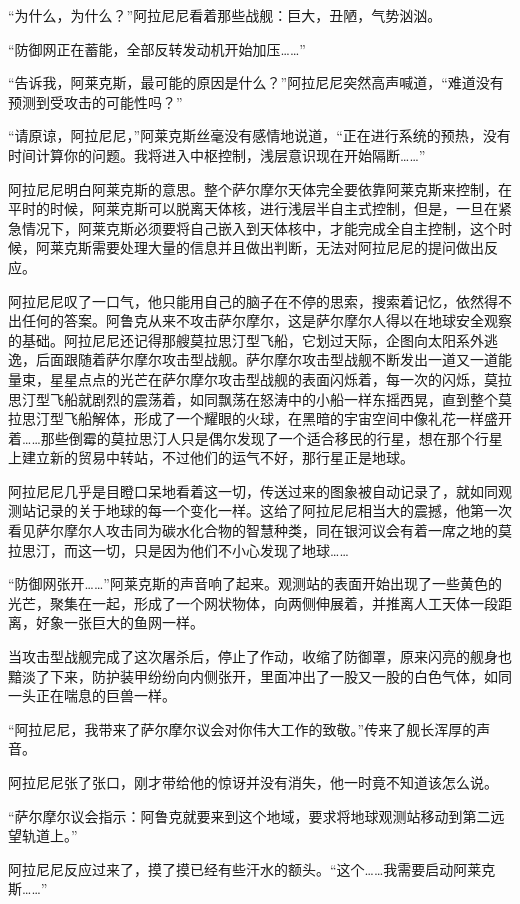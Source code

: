 “为什么，为什么？”阿拉尼尼看着那些战舰：巨大，丑陋，气势汹汹。

“防御网正在蓄能，全部反转发动机开始加压……”

“告诉我，阿莱克斯，最可能的原因是什么？”阿拉尼尼突然高声喊道，“难道没有预测到受攻击的可能性吗？”

“请原谅，阿拉尼尼，”阿莱克斯丝毫没有感情地说道，“正在进行系统的预热，没有时间计算你的问题。我将进入中枢控制，浅层意识现在开始隔断……”

阿拉尼尼明白阿莱克斯的意思。整个萨尔摩尔天体完全要依靠阿莱克斯来控制，在平时的时候，阿莱克斯可以脱离天体核，进行浅层半自主式控制，但是，一旦在紧急情况下，阿莱克斯必须要将自己嵌入到天体核中，才能完成全自主控制，这个时候，阿莱克斯需要处理大量的信息并且做出判断，无法对阿拉尼尼的提问做出反应。

阿拉尼尼叹了一口气，他只能用自己的脑子在不停的思索，搜索着记忆，依然得不出任何的答案。阿鲁克从来不攻击萨尔摩尔，这是萨尔摩尔人得以在地球安全观察的基础。阿拉尼尼还记得那艘莫拉思汀型飞船，它划过天际，企图向太阳系外逃逸，后面跟随着萨尔摩尔攻击型战舰。萨尔摩尔攻击型战舰不断发出一道又一道能量束，星星点点的光芒在萨尔摩尔攻击型战舰的表面闪烁着，每一次的闪烁，莫拉思汀型飞船就剧烈的震荡着，如同飘荡在怒涛中的小船一样东摇西晃，直到整个莫拉思汀型飞船解体，形成了一个耀眼的火球，在黑暗的宇宙空间中像礼花一样盛开着……那些倒霉的莫拉思汀人只是偶尔发现了一个适合移民的行星，想在那个行星上建立新的贸易中转站，不过他们的运气不好，那行星正是地球。

阿拉尼尼几乎是目瞪口呆地看着这一切，传送过来的图象被自动记录了，就如同观测站记录的关于地球的每一个变化一样。这给了阿拉尼尼相当大的震撼，他第一次看见萨尔摩尔人攻击同为碳水化合物的智慧种类，同在银河议会有着一席之地的莫拉思汀，而这一切，只是因为他们不小心发现了地球……

“防御网张开……”阿莱克斯的声音响了起来。观测站的表面开始出现了一些黄色的光芒，聚集在一起，形成了一个网状物体，向两侧伸展着，并推离人工天体一段距离，好象一张巨大的鱼网一样。

当攻击型战舰完成了这次屠杀后，停止了作动，收缩了防御罩，原来闪亮的舰身也黯淡了下来，防护装甲纷纷向内侧张开，里面冲出了一股又一股的白色气体，如同一头正在喘息的巨兽一样。

“阿拉尼尼，我带来了萨尔摩尔议会对你伟大工作的致敬。”传来了舰长浑厚的声音。

阿拉尼尼张了张口，刚才带给他的惊讶并没有消失，他一时竟不知道该怎么说。

“萨尔摩尔议会指示：阿鲁克就要来到这个地域，要求将地球观测站移动到第二远望轨道上。”

阿拉尼尼反应过来了，摸了摸已经有些汗水的额头。“这个……我需要启动阿莱克斯……”

